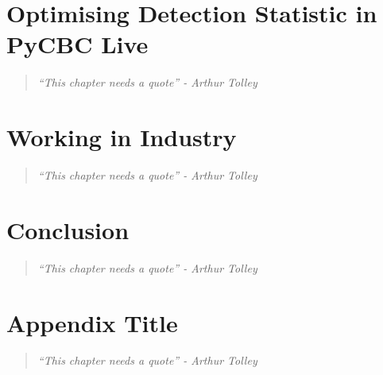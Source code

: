 \documentclass[12pt,twoside]{report} %
\newcommand{\chapterquote}[1]{
  \begin{quote}
    \color{mediumgray}\itshape #1
  \end{quote}
}
\begin{document}
\chapter[Optimising Detection Statistic in PyCBC Live]{\label{chaper:7-snr-optimizer}Optimising Detection Statistic in PyCBC Live}
\chapterquote{``This chapter needs a quote'' - Arthur Tolley}


\chapter[Working in Industry]{\label{chapter:8-industry}Working in Industry}
\chapterquote{``This chapter needs a quote'' - Arthur Tolley}


\chapter[Conclusion]{\label{chapter:conclusion}Conclusion}
\chapterquote{``This chapter needs a quote'' - Arthur Tolley}


\appendix
\chapter[Appendix]{Appendix Title}
\chapterquote{``This chapter needs a quote'' - Arthur Tolley}


% 
% 
\nocite{*}
\printbibliography
\end{document}
